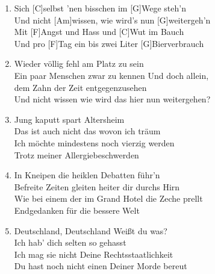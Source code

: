 \def\Titel{Sich selbst}
\def\Interpret{YOK (RAK)}
\def\Referenz{text}

\LiedSetup{}

\begin{guitarMagic}
    \begin{enumerate}

        \item Sich [C]selbst 'nen bisschen im [G]Wege steh'n\\
            Und nicht [Am]wissen, wie wird's nun [G]weitergeh'n\\
            Mit [F]Angst und Hass und [C]Wut im Bauch\\
            Und pro [F]Tag ein bis zwei Liter [G]Bierverbrauch\\

        \item Wieder völlig fehl am Platz zu sein\\
            Ein paar Menschen zwar zu kennen Und doch allein,\\
            dem Zahn der Zeit entgegenzusehen\\
            Und nicht wissen wie wird das hier nun weitergehen?\\

        \item Jung kaputt spart Altersheim\\
            Das ist auch nicht das wovon ich träum\\
            Ich möchte mindestens noch vierzig werden\\
            Trotz meiner Allergiebeschwerden\\

            \liedweiter
        \item In Kneipen die heiklen Debatten führ'n\\
            Befreite Zeiten gleiten heiter dir durchs Hirn\\
            Wie bei einem der im Grand Hotel die Zeche prellt\\
            Endgedanken für die bessere Welt\\


        \item Deutschland, Deutschland Weißt du was?\\
            Ich hab' dich selten so gehasst\\
            Ich mag sie nicht Deine Rechtsstaatlichkeit\\
            Du hast noch nicht einen Deiner Morde bereut\\

    \end{enumerate}
\end{guitarMagic}
